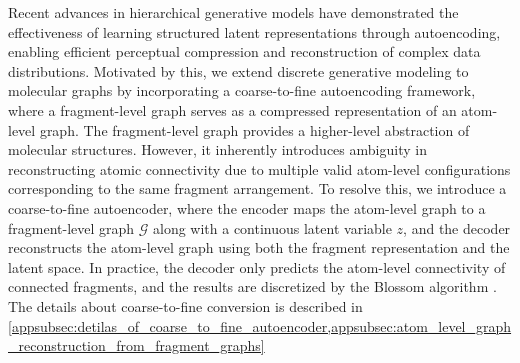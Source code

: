 Recent advances in hierarchical generative models \citep{vqvae2, ldm, hierdiff} have demonstrated the effectiveness of learning structured latent representations through autoencoding, enabling efficient perceptual compression and reconstruction of complex data distributions. 
Motivated by this, we extend discrete generative modeling to molecular graphs by incorporating a coarse-to-fine autoencoding framework, where a fragment-level graph serves as a compressed representation of an atom-level graph.
The fragment-level graph provides a higher-level abstraction of molecular structures. 
However, it inherently introduces ambiguity in reconstructing atomic connectivity due to multiple valid atom-level configurations corresponding to the same fragment arrangement. 
To resolve this, we introduce a coarse-to-fine autoencoder, where the encoder maps the atom-level graph to a fragment-level graph $\mathcal{G}$ along with a continuous latent variable $z$, and the decoder reconstructs the atom-level graph using both the fragment representation and the latent space.
In practice, the decoder only predicts the atom-level connectivity of connected fragments, and the results are discretized by the Blossom algorithm \citep{blossom_alg}.
The details about coarse-to-fine conversion is described in \cref{appsubsec:detilas_of_coarse_to_fine_autoencoder,appsubsec:atom_level_graph_reconstruction_from_fragment_graphs}


% 


